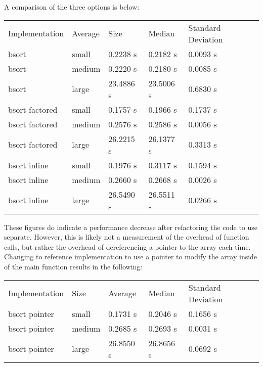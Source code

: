 \documentclass{article}
\begin{document}
A comparison of the three options is below:

\begin{center}
\begin{tabular}{lllll}
 Implementation  &  Average  & Size &  Median     &  Standard Deviation  \\
 bsort           &  small    &  0.2238 s   &  0.2182 s            &  0.0093 s  \\
 bsort           &  medium   &  0.2220 s   &  0.2180 s            &  0.0085 s  \\
 bsort           &  large    &  23.4886 s  &  23.5006 s           &  0.6830 s  \\
 bsort factored  &  small    &  0.1757 s   &  0.1966 s            &  0.1737 s  \\
 bsort factored  &  medium   &  0.2576 s   &  0.2586 s            &
 0.0056 s  \\
bsort factored  &  large    &  26.2215 s  &  26.1377 s           &  0.3313 s  \\
 bsort inline    &  small    &  0.1976 s   &  0.3117 s            &  0.1594 s  \\
 bsort inline    &  medium   &  0.2660 s   &  0.2668 s            &
 0.0026 s  \\
bsort inline    &  large    &  26.5490 s  &  26.5511 s           &  0.0266 s  \\
\end{tabular}
\end{center}

These figures do indicate a performance decrease after refactoring
the code to use separate. However, this is likely not a
measurement of the overhead of function calls, but rather the overhead
of dereferencing a pointer to the array each time. Changing to
reference implementation to use a pointer to modify the array inside
of the main function results in the following:

\begin{center}
\begin{tabular}{lllll}
 Implementation  &  Size    &  Average    &  Median     &  Standard Deviation  \\
 bsort pointer   &  small   &  0.1731 s   &  0.2046 s   &  0.1656 s            \\
 bsort pointer   &  medium  &  0.2685 s   &  0.2693 s   &  0.0031 s            \\
 bsort pointer   &  large   &  26.8550 s  &  26.8656 s  &  0.0692 s            \\
\end{tabular}
\end{center}
\end{document}
